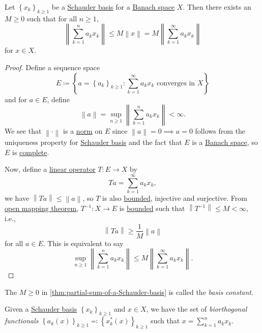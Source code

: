 \begin{theorem}\label{thm:partial-sum-of-a-Schauder-basis}
	Let \(\left\{ x_k \right\} _{k\geq 1}\) be a \hyperref[def:Schauder-basis]{Schauder basis} for a \hyperref[def:Banach-space]{Banach space} \(X\). Then there exists an \(M \geq 0\) such that for all \(n \geq 1\),
	\[
		\left\lVert \sum\limits_{k=1}^{n} a_k x_k\right\rVert \leq M \left\lVert x\right\rVert = M \left\lVert \sum\limits_{k=1}^{\infty} a_k x_k\right\rVert
	\]
	for \(x\in X\).
\end{theorem}
\begin{proof}
	Define a sequence space
	\[
		E \coloneqq \left\{ a= \left\{ a_k \right\} _{k\geq 1}\colon \sum\limits_{k=1}^{\infty} a_k x_k \text{ converges in \(X\)} \right\}
	\]
	and for \(a\in E\), define
	\[
		\left\lVert a\right\rVert = \sup _{n \geq 1} \left\lVert \sum\limits_{k=1}^{n} a_k x_k\right\rVert < \infty.
	\]
	We see that \(\left\lVert \cdot \right\rVert \) is a \hyperref[def:norm]{norm} on \(E\) since \(\left\lVert a\right\rVert = 0 \implies a=0\) follows from the uniqueness property for \hyperref[def:Schauder-basis]{Schauder basis} and the fact that \(E\) is a \hyperref[def:Banach-space]{Banach space}, so \(E\) is \hyperref[def:complete-system]{complete}.

	Now, define a \hyperref[def:linear-op]{linear operator} \(T\colon E\to X\) by
	\[
		Ta = \sum\limits_{k=1}^{\infty} a_k x_k,
	\]
	we have \(\left\lVert Ta\right\rVert \leq \left\lVert a\right\rVert \), so \(T\) is also \hyperref[def:bounded-linear-op]{bounded}, injective and surjective. From \hyperref[thm:open-mapping]{open mapping theorem}, \(T ^{-1} \colon X\to E\) is \hyperref[def:bounded-linear-op]{bounded} such that \(\left\lVert T^{-1} \right\rVert \leq M < \infty\), i.e.,
	\[
		\left\lVert Ta\right\rVert \geq \frac{1}{M} \left\lVert a\right\rVert
	\]
	for all \(a\in E\). This is equivalent to say
	\[
		\sup _{n \geq 1} \left\lVert \sum\limits_{k=1}^{n} a_k x_k\right\rVert \leq M \left\lVert \sum\limits_{k=1}^{\infty} a_k x_k\right\rVert.
	\]
\end{proof}

\begin{notation}\label{not:basis-constant}
	The \(M\geq 0\) in \autoref{thm:partial-sum-of-a-Schauder-basis} is called the \emph{basis constant}.
\end{notation}

\begin{definition}\label{def:biorthogonal-functional}
	Given a \hyperref[def:Schauder-basis]{Schauder basis} \(\left\{ x_k \right\} _{k\geq 1}\) and \(x\in X\), we have the set of \emph{biorthogonal functionals} \(\left\{ a_k(x) \right\} _{k\geq 1} \eqqcolon \left\{ x^{\ast} _k (x)\right\}_{k\geq 1} \) such that \(x = \sum_{k=1}^n a_k x_k \).
\end{definition}

